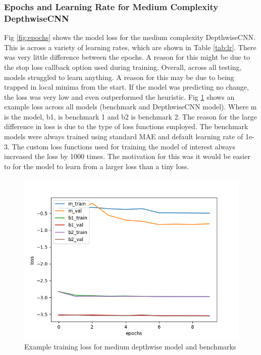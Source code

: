 \subsubsection*{Epochs and Learning Rate for Medium Complexity DepthwiseCNN}
Fig \ref{fig:epochs} shows the model loss for the medium complexity DepthwiseCNN. This is across a variety of learning rates, which are shown in Table \ref{tab:lr}. There was very little difference between the epochs. A reason for this might be due to the stop loss callback option used during training. Overall, across all testing, models struggled to learn anything. A reason for this may be due to being trapped in local minima from the start. If the model was predicting no change, the loss was very low and even outperformed the heuristic. Fig \ref{fig:egloss-epochs} shows an example loss across all models (benchmark and DepthwiseCNN model). Where m is the model, b1, is benchmark 1 and b2 is benchmark 2. The reason for the large difference in loss is due to the type of loss functions employed. The benchmark models were always trained using standard MAE and default learning rate of 1e-3. The custom loss functions used for training the model of interest always increased the loss by 1000 times. The motivation for this was it would be easier to for the model to learn from a larger loss than a tiny loss.

\begin{figure}[tbph]
	\centering
	\includegraphics[width=0.9\linewidth, height=0.3\textheight]{Figures/Results/Diff_Complexity_Lr_Epochs/Epochs_Lr/medium_depthwise_diff_train_2_custom_mae_weighted_2e-3_more_epochs_norm_independant_292_training}
	\caption[Example Loss for Medium depthwise model and benchmarks]{Example training loss for medium depthwise model and benchmarks}
	\label{fig:egloss-epochs}
\end{figure}



